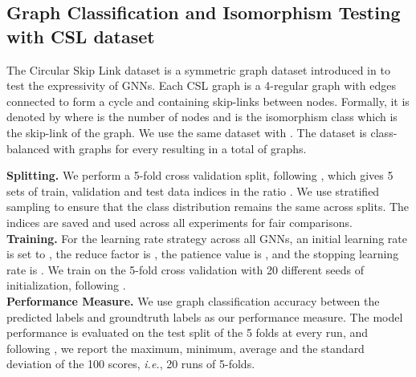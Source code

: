 \documentclass{article}
\begin{document}
\subsection{Graph Classification and Isomorphism Testing with CSL dataset}

The Circular Skip Link dataset is a symmetric graph dataset introduced in \cite{murphy2019relational} to test the expressivity of GNNs. Each CSL graph is a 4-regular graph with edges connected to form a cycle and containing skip-links between nodes. Formally, it is denoted by  where  is the number of nodes and  is the isomorphism class which is the skip-link of the graph. We use the same dataset  with . The dataset is class-balanced with  graphs for every  resulting in a total of  graphs.

{\bf Splitting.} We perform a 5-fold cross validation split, following \cite{murphy2019relational}, which gives 5 sets of train, validation and test data indices in the ratio . We use stratified sampling to ensure that the class distribution remains the same across splits. The indices are saved and used across all experiments for fair comparisons.\\
{\bf Training.} For the learning rate strategy across all GNNs, an initial learning rate is set to , the reduce factor is , the patience value is , and the stopping learning rate is . We train on the 5-fold cross validation with 20 different seeds of initialization, following \cite{chen2019equivalence}.
\\
{\bf Performance Measure.} We use graph classification accuracy between the predicted labels and groundtruth labels as our performance measure. The model performance is evaluated on the test split of the 5 folds at every run, and following \cite{murphy2019relational, chen2019equivalence}, we report the maximum, minimum, average and the standard deviation of the 100 scores, \textit{i.e.}, 20 runs of 5-folds.
\end{document}
